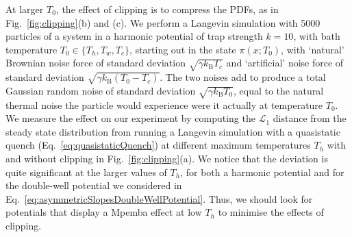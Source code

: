 \documentclass[hyperref={colorlinks=true, urlcolor=blue, citecolor=blue, final, bound}]{sfuthesis}
\newcommand{\kB}{k_{\mathrm{B}}}
\begin{document}
At larger $T_0$, the effect of clipping is to compress the PDFs, as in Fig.~\ref{fig:clipping}(b) and (c).
We perform a Langevin simulation with \num{5000} particles of a system in a harmonic potential of trap strength $k=10$, with bath temperature $T_0\in\{T_h, T_w, T_c\}$, starting out in the state $\pi(x;T_0)$, with `natural' Brownian noise force of standard deviation $\sqrt{\gamma\kB T_c}$ and `artificial' noise force of standard deviation $\sqrt{\gamma\kB (T_0-T_c)}$. The two noises add to produce a total Gaussian random noise of standard deviation $\sqrt{\gamma\kB T_0}$, equal to the natural thermal noise the particle would experience were it actually at temperature $T_0$. We measure the effect on our experiment by computing the $\mathcal L_1$ distance from the steady state distribution from running a Langevin simulation with a quasistatic quench (Eq.~\ref{eq:quasistaticQuench}) at different maximum temperatures $T_h$ with and without clipping in Fig.~\ref{fig:clipping}(a). We notice that the deviation is quite significant at the larger values of $T_h$, for both a harmonic potential and for the double-well potential we considered in Eq.~\ref{eq:asymmetricSlopesDoubleWellPotential}. Thus, we should look for potentials that display a Mpemba effect at low $T_h$ to minimise the effects of clipping.
\end{document}
